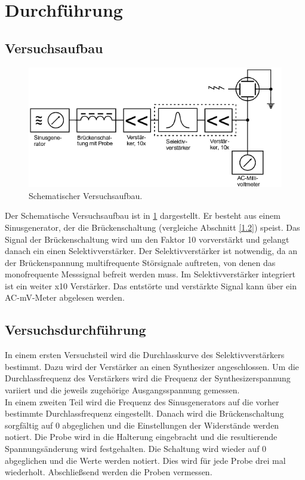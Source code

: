 \section{Durchführung}
\subsection{Versuchsaufbau}
\begin{figure}
  \centering
  \includegraphics[scale=0.5]{Aufbau.png}
  \caption{Schematischer Versuchsaufbau\cite{anleitung}.}
  \label{abb:2}
\end{figure}
Der Schematische Versuchsaufbau ist in \ref{abb:2} dargestellt. Er besteht aus einem Sinusgenerator,
der die Brückenschaltung (vergleiche Abschnitt \ref{1.2}) speist. Das Signal der Brückenschaltung
wird um den Faktor 10 vorverstärkt und gelangt danach ein einen Selektivverstärker.
Der Selektivverstärker ist notwendig, da an der Brückenspannung multifrequente
Störsignale auftreten, von denen das monofrequente Messsignal befreit werden muss.
Im Selektivverstärker integriert ist ein weiter x10 Verstärker. Das entstörte und verstärkte
Signal kann über ein AC-\si{\milli\volt}-Meter abgelesen werden.
\subsection{Versuchsdurchführung}
In einem ersten Versuchsteil wird die Durchlasskurve des Selektivverstärkers bestimmt.
Dazu wird der Verstärker an einen Synthesizer angeschlossen. Um die Durchlassfrequenz des
Verstärkers wird die Frequenz der Synthesizerspannung variiert und die jeweils zugehörige
Ausgangsspannung gemessen.\\
\noindent
In einem zweiten Teil wird die Frequenz des Sinusgenerators auf die vorher bestimmte
Durchlassfrequenz eingestellt. Danach wird die Brückenschaltung sorgfältig auf 0 abgeglichen
und die Einstellungen der Widerstände werden notiert. Die Probe wird in die Halterung eingebracht
und die resultierende Spannungsänderung wird festgehalten. Die Schaltung wird wieder
auf 0 abgeglichen und die Werte werden notiert. Dies wird für jede Probe drei mal wiederholt.
Abschließsend werden die Proben vermessen.
